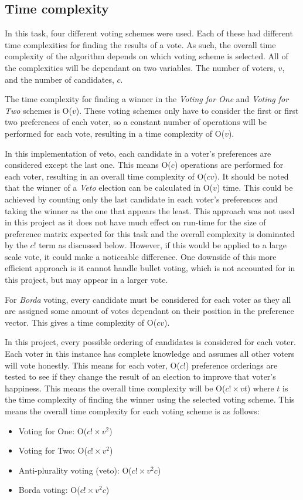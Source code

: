 \subsection{Time complexity} \label{sec:tc}
In this task, four different voting schemes were used. Each of these had different time complexities for finding the results of a vote. As such, the overall time complexity of the algorithm depends on which voting scheme is selected. All of the complexities will be dependant on two variables. The number of voters, $v$, and the number of candidates, $c$.

The time complexity for finding a winner in the \textit{Voting for One} and \textit{Voting for Two} schemes is O($v$). These voting schemes only have to consider the first or first two preferences of each voter, so a constant number of operations will be performed for each vote, resulting in a time complexity of O($v$).

In this implementation of veto, each candidate in a voter's preferences are considered except the last one. This means O($c$) operations are performed for each voter, resulting in an overall time complexity of O($cv$). It should be noted that the winner of a \textit{Veto} election can be calculated in O($v$) time. This could be achieved by counting only the last candidate in each voter's preferences and taking the winner as the one that appears the least. This approach was not used in this project as it does not have much effect on run-time for the size of preference matrix expected for this task and the overall complexity is dominated by the $c!$ term as discussed below. However, if this would be applied to a large scale vote, it could make a noticeable difference. One downside of this more efficient approach is it cannot handle bullet voting, which is not accounted for in this project, but may appear in a larger vote.

For \textit{Borda} voting, every candidate must be considered for each voter as they all are assigned some amount of votes dependant on their position in the preference vector. This gives a time complexity of O($cv$).

In this project, every possible ordering of candidates is considered for each voter. Each voter in this instance has complete knowledge and assumes all other voters will vote honestly. This means for each voter, O($c!$) preference orderings are tested to see if they change the result of an election to improve that voter's happiness. This means the overall time complexity will be O($c! \times vt$) where $t$ is the time complexity of finding the winner using the selected voting scheme. This means the overall time complexity for each voting scheme is as follows:
\begin{itemize}
    \item Voting for One: O($c! \times v^2$)
    \item Voting for Two: O($c! \times v^2$)
    \item Anti-plurality voting (veto): O($c! \times v^2c$)
    \item Borda voting: O($c! \times v^2c$)
\end{itemize}

